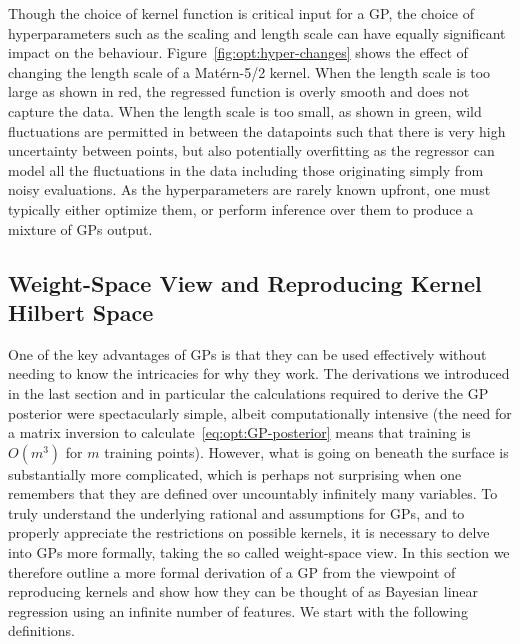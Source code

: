 Though the choice of kernel function is critical input for a GP, the choice of
hyperparameters such as the scaling and length scale can have equally
significant impact on the behaviour.  Figure~\ref{fig:opt:hyper-changes} shows
the effect of changing the length scale of a Mat\'{e}rn-5/2 kernel.  When the length
scale is too large as shown in red, the regressed function is overly smooth and
does not capture the data.  When the length scale is too small, as shown in green,
wild fluctuations are permitted in between the datapoints such that there is very
high uncertainty between points, but also potentially overfitting as the regressor
can model all the fluctuations in the data including those originating simply from
noisy evaluations.
As the hyperparameters are rarely known upfront, one must typically either optimize
them, or perform inference over them to produce a mixture of GPs output.

\subsection{Weight-Space View and Reproducing Kernel Hilbert Space}
\label{sec:opt:gps:weight}

One of the key advantages of GPs is that they can be used effectively without needing
to know the intricacies for why they work.  The derivations we introduced in the
last section and in particular the calculations required to derive the GP posterior were
spectacularly simple, albeit computationally intensive (the need for a matrix inversion
to calculate~\eqref{eq:opt:GP-posterior} means that training is $O(m^3)$ for
$m$ training points).  However, what is going on beneath the surface is substantially
more complicated, which is perhaps not surprising when one remembers that they
are defined over uncountably infinitely many variables.  
To truly understand the underlying rational and assumptions for GPs, and to properly
appreciate the restrictions on possible kernels, it is necessary to delve into GPs more
formally, taking the so called weight-space view.
In this section we therefore outline a more formal derivation of a GP
from the viewpoint of reproducing kernels \cite{hofmann2008kernel}
and show how they can be thought of as Bayesian linear regression
using an infinite number of features.
We start with the following definitions.


